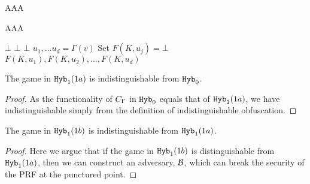 
\begin{lemma}
	\label{lemma:hybA}
	AAA
\end{lemma}

\begin{lemma}
	\label{lemma:hybB}
	AAA
\end{lemma}

\begin{algorithm}[H]
	\caption{
		Circuit for the neighbor function, $\circNeigb^{w^*, \Gamma(w^*)_1, \dots, \Gamma(w^*)_d}$ with punctured PRF key
		$K(\set{w^*})$ and constant $z^*$%
	}
	\begin{algorithmic}[1]
				\State \Return $\bot$
			\EndIf
				\State \Return $\bot$ 
			\EndIf
				\State \Return $\bot$
			\EndIf
			\State $u_1, \dots u_d = \Gamma(v)$
			 	\State Set $F(K, u_j) = \bot$
			\EndIf
			\State \Return $F(K, u_1), F(K, u_2), \dots, F(K, u_d)$
		\EndFunction
	\end{algorithmic}
	\label{alg:neighbHyb1}
\end{algorithm}

 

	\begin{lemma}
		The game in $\texttt{Hyb}_1 (1a)$ is indistinguishable from $\texttt{Hyb}_0$.
		\begin{proof}
			As the functionality of $C_\Gamma$ in $\texttt{Hyb}_0$ equals that of $\texttt{Hyb}_1 (1a)$,
			we have indistinguishable simply from the definition of indistinguishable obfuscation.
		\end{proof}
	\end{lemma}

	\begin{lemma}
		The game in $\texttt{Hyb}_1 (1b)$ is indistinguishable from $\texttt{Hyb}_1 (1a)$.
		\begin{proof}
			Here we argue that if the game in $\texttt{Hyb}_1 (1b)$ is distinguishable from
			$\texttt{Hyb}_1 (1a)$, then we can construct an adversary, $\mathcal{B}$, which can break the security of the PRF
			at the punctured point. 


		\end{proof}
	\end{lemma}

